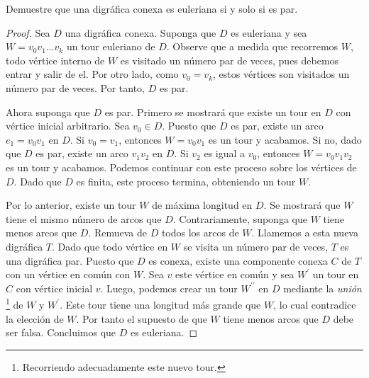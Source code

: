 \documentclass[12pt]{article}
\newenvironment{problem}[2][Problema]{\begin{trivlist}
\item[\hskip \labelsep {\bfseries #1}\hskip \labelsep {\bfseries #2.}]}{\end{trivlist}}
\begin{document}
\begin{problem}{3.4.8} Demuestre que una digráfica conexa es euleriana si y solo si es par.
\end{problem}
\begin{proof}
Sea $D$ una digráfica conexa. Suponga que $D$ es euleriana y sea $W = v_0 v_1 \ldots v_k$ un tour euleriano de $D.$ Observe que a medida que recorremos $W$, todo vértice interno de $W$ es visitado un número par de veces, pues debemos entrar y salir de el. Por otro lado, como $v_0 = v_k$, estos vértices son visitados un número par de veces. Por tanto, $D$ es par.

Ahora suponga que $D$ es par. Primero se mostrará que existe un tour en $D$ con vértice inicial arbitrario. Sea $v_0 \in D$. Puesto que $D$ es par, existe un arco $e_1 = v_0 v_1$ en $D$. Si $ v_0 = v_1$, entonces $W = v_0v_1$ es un tour y acabamos. Si no, dado que $D$ es par, existe un arco $v_1 v_2$ en $D$. Si $v_2$ es igual a $v_0$, entonces $W = v_0 v_1 v_2$ es un tour y acabamos. Podemos continuar con este proceso sobre los vértices de $D$. Dado que $D$ es finita, este proceso termina, obteniendo un tour $W.$

Por lo anterior, existe un tour $W$ de máxima longitud en $D.$ Se mostrará que $W$ tiene el mismo número de arcos que $D$. Contrariamente, suponga que $W$ tiene menos arcos que $D$. Remueva de $D$ todos los arcos de $W$. Llamemos a esta nueva digráfica $T$. Dado que todo vértice en $W$ se visita un número par de veces, $T$ es una digráfica par. Puesto que $D$ es conexa, existe una componente conexa $C$ de $T$ con un vértice en común con $W.$ Sea $v$ este vértice en común y sea $W^\prime$ un tour en $C$ con vértice inicial $v.$ Luego, podemos crear un tour $W^{\prime \prime}$ en $D$ mediante la \textit{unión} \footnote{Recorriendo adecuadamente este nuevo tour.} de $W$ y $W^\prime$. Este tour tiene una longitud más grande que $W$, lo cual contradice la elección de $W.$ Por tanto el supuesto de que $W$ tiene menos arcos que $D$ debe ser falsa. Concluimos que $D$ es euleriana.
\end{proof}



\printbibliography
\end{document}
